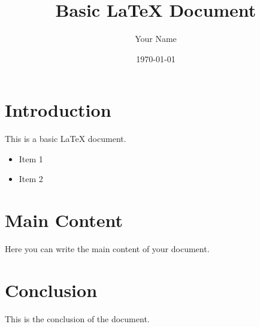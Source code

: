 \documentclass{article}
\begin{document}
\title{Basic LaTeX Document}
\author{Your Name}
\date{\today}

\maketitle

\section{Introduction}
This is a basic LaTeX document.

\begin{itemize}
    \item Item 1
    \item Item 2
\end{itemize}

\section{Main Content}
Here you can write the main content of your document.

\section{Conclusion}
This is the conclusion of the document.
\end{document}
